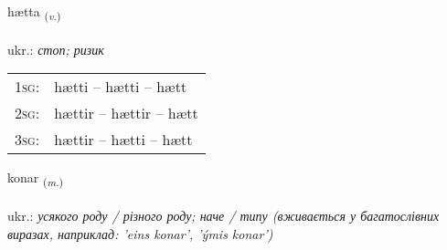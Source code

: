 \documentclass[frontgrid, backgrid]{flacards}\usepackage[]{graphicx}\usepackage[]{xcolor}
\begin{document}
\renewcommand{\flhead}{\vskip5pt \fboxsep=0pt {\small\bfseries\footnotesize Sagnorð | дієслово}}
\renewcommand{\fcfoot}{\vskip5pt \fboxsep=0pt \hspace{2pt}{\small\bfseries\footnotesize 1K}}

\renewcommand{\blhead}{\vskip5pt {\small\bfseries\footnotesize Sagnorð | дієслово }}
\renewcommand{\bcfoot}{\vskip5pt \hspace{2pt}{\small\bfseries\footnotesize 1K}}


{hætta \small{\textsubscript{(\textit{v.})}} \\[1ex] %
\textphonetic{[haihta]} \\
ukr.: \emph{стоп; ризик} \\  [2ex]
\renewcommand*{\arraystretch}{0.8}
\begin{tabular}{p{1cm}l}
\textsc{1sg}: & hætti -- hætti -- hætt \\ 
\textsc{2sg}: & hættir -- hættir -- hætt \\ 
\textsc{3sg}: & hættir -- hætti -- hætt \\ 
\end{tabular}
}

\renewcommand{\flhead}{\vskip5pt \fboxsep=0pt {\small\bfseries\footnotesize Nafnorð | іменник}}
\renewcommand{\fcfoot}{\vskip5pt \fboxsep=0pt \hspace{2pt}{\small\bfseries\footnotesize 1K}}

\renewcommand{\blhead}{\vskip5pt {\small\bfseries\footnotesize Nafnorð | іменник }}
\renewcommand{\bcfoot}{\vskip5pt \hspace{2pt}{\small\bfseries\footnotesize 1K}}


{konar \small{\textsubscript{(\textit{m.})}} \\[1ex] %
\textphonetic{[kʰɔːnar]} \\
ukr.: \emph{усякого роду / різного роду; наче / типу (вживається у багатослівних виразах, наприклад: 'eins konar', 'ýmis konar')} \\  [2ex]
\renewcommand*{\arraystretch}{0.8}
}
\end{document}
